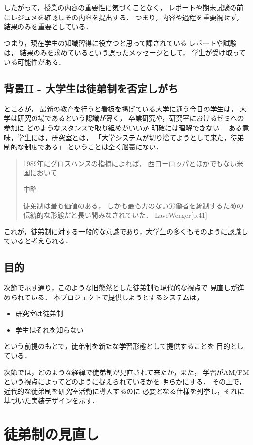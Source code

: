 \documentclass{jsarticle}
\begin{document}
したがって，授業の内容の重要性に気づくことなく，
レポートや期末試験の前にレジュメを確認しその内容を提出する．
つまり，内容や過程を重要視せず，結果のみを重要としている．

つまり，現在学生の知識習得に役立つと思って課されている
レポートや試験は，
結果のみを求めているという誤ったメッセージとして，
学生が受け取っている可能性がある．

\subsection{背景II - 大学生は徒弟制を否定しがち}
\label{sec:org4023c9e}
ところが，
最新の教育を行うと看板を掲げている大学に通う今日の学生は，
大学は研究の場であるという認識が薄く，
卒業研究や，研究室におけるゼミへの参加に
どのようなスタンスで取り組めがいいか
明確には理解できない．
ある意味，学生には，研究室とは，
「大学システムが切り捨てようとして来た，徒弟制的な制度である」
ということは全く脳裏にない．
\begin{quote}
1989年にグロスハンスの指摘によれば，
西ヨーロッパとほかでもない米国において

中略

徒弟制は最も価値のある，
しかも最も力のない労働者を統制するための伝統的な形態だと長い間みなされていた．
LaveWenger[p.41]
\end{quote}
これが，徒弟制に対する一般的な意識であり，大学生の多くもそのように認識していると考えられる．

\subsection{目的}
\label{sec:org6e92541}
次節で示す通り，このような旧態然とした徒弟制も現代的な視点で
見直しが進められている．
本プロジェクトで提供しようとするシステムは，
\begin{itemize}
\item 研究室は徒弟制
\item 学生はそれを知らない
\end{itemize}
という前提のもとで，徒弟制を新たな学習形態として提供することを
目的としている．

次節では，どのような経緯で徒弟制が見直されて来たか，また，
学習がAM/PMという視点によってどのように捉えられているかを
明らかにする．
その上で，近代的な徒弟制を研究室活動に導入するのに
必要となる仕様を列挙し，それに基づいた実装デザインを示す．

\section{徒弟制の見直し}
\label{sec:org1b4af24}
\end{document}
